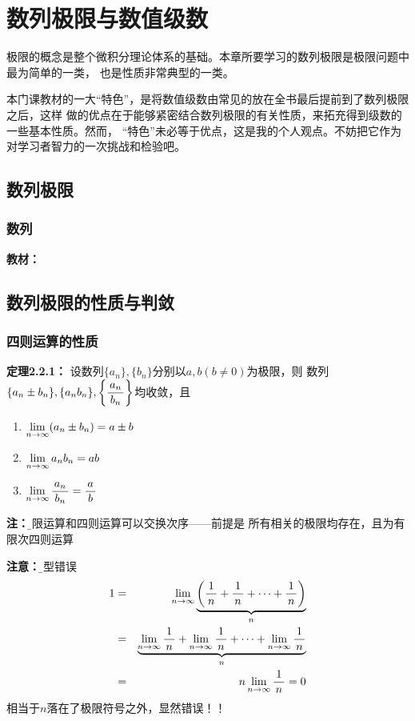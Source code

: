\setcounter{chapter}{1}

\chapter{数列极限与数值级数}

极限的概念是整个微积分理论体系的基础。本章所要学习的数列极限是极限问题中最为简单的一类，
也是性质非常典型的一类。

本门课教材的一大“特色”，是将数值级数由常见的放在全书最后提前到了数列极限之后，这样
做的优点在于能够紧密结合数列极限的有关性质，来拓充得到级数的一些基本性质。然而，
“特色”未必等于优点，这是我的个人观点。不妨把它作为对学习者智力的一次挑战和检验吧。

\section{数列极限}

\subsection{数列}

{\bf 教材：}

\section{数列极限的性质与判敛}

\subsection{四则运算的性质}

{\bf 定理2.2.1：}
设数列$\{a_n\},\{b_n\}$分别以$a,b(b\neq 0)$为极限，则
数列$\{a_n\pm b_n\},\{a_nb_n\},\left\{\df{a_n}{b_n}\right\}$均收敛，且
\begin{enumerate}
  \setlength{\itemindent}{1cm}
  \item $\limn(a_n\pm b_n)=a\pm b$
  \item $\limn a_nb_n=ab$
  \item $\limn\df{a_n}{b_n}=\df ab$
\end{enumerate}

{\bf 注：}{\b 极限运算和四则运算可以交换次序——前提是
所有相关的极限均存在，且为有限次四则运算}

{\bf 注意：}{\b 典型错误
\begin{eqnarray*}
	1&=&\limn \underbrace{\left(\df 1n+\df 1n+\cdots+\df 1n\right)}_{n}\\
	&=&\underbrace{\limn\df1n+\limn\df1n+\cdots+\limn\df1n}_{n}\\
	&=&n\limn\df1n=0
\end{eqnarray*}}
相当于$n$落在了极限符号之外，显然错误！！

